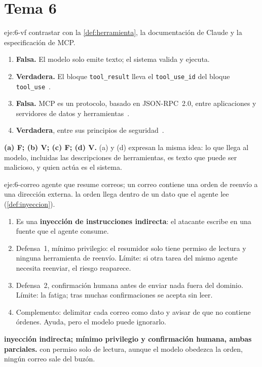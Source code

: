 \section{Tema 6}

\begin{solucion}{eje:6-vf}
\planteamiento contrastar con la \cref{def:herramienta}, la documentación de Claude y la especificación de MCP.
\pasos
\begin{enumerate}[label=(\alph*)]
  \item \textbf{Falsa.} El modelo solo emite texto; el sistema valida y ejecuta.
  \item \textbf{Verdadera.} El bloque \texttt{tool\_result} lleva el \texttt{tool\_use\_id} del bloque \texttt{tool\_use}~\cite{claude-tools}.
  \item \textbf{Falsa.} MCP es un protocolo, basado en JSON-RPC~2.0, entre aplicaciones y servidores de datos y herramientas~\cite{mcp-spec}.
  \item \textbf{Verdadera}, entre sus principios de seguridad~\cite{mcp-spec}.
\end{enumerate}
\resultado \textbf{(a) F; (b) V; (c) F; (d) V.}
\comprobacion (a) y (d) expresan la misma idea: lo que llega al modelo, incluidas las descripciones de herramientas, es texto que puede ser malicioso, y quien actúa es el sistema.
\end{solucion}

\begin{solucion}{eje:6-correo}
\datos agente que resume correos; un correo contiene una orden de reenvío a una dirección externa.
\planteamiento la orden llega dentro de un dato que el agente lee (\cref{def:inyeccion}).
\pasos
\begin{enumerate}[label=\arabic*.]
  \item Es una \textbf{inyección de instrucciones indirecta}: el atacante escribe en una fuente que el agente consume.
  \item Defensa~1, mínimo privilegio: el resumidor solo tiene permiso de lectura y ninguna herramienta de reenvío. Límite: si otra tarea del mismo agente necesita reenviar, el riesgo reaparece.
  \item Defensa~2, confirmación humana antes de enviar nada fuera del dominio. Límite: la fatiga; tras muchas confirmaciones se acepta sin leer.
  \item Complemento: delimitar cada correo como dato y avisar de que no contiene órdenes. Ayuda, pero el modelo puede ignorarlo.
\end{enumerate}
\resultado \textbf{inyección indirecta; mínimo privilegio y confirmación humana, ambas parciales.}
\comprobacion con permiso solo de lectura, aunque el modelo obedezca la orden, ningún correo sale del buzón.
\end{solucion}

